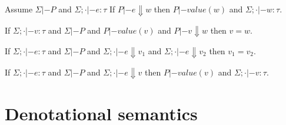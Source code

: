 \documentclass[preprint,nocopyrightspace,draft]{sigplanconf}
\begin{document}
\begin{lemma}
Assume $\Sigma |- P$ and $\Sigma;\cdot |- e : \tau$
If $P |- e \Downarrow w$ then $P |- value(w)$ and $\Sigma;\cdot |- w : \tau$.
\end{lemma}



\newcommand{\lcf}[1]{\textsf{cf}(#1)}
\newcommand{\lcfZ}{\textsf{cf}}
\newcommand{\lncf}[1]{\neg\textsf{cf}(#1)}
\newcommand{\unr}{\mathop{unr}}
\newcommand{\bad}{\mathop{bad}}
\newcommand{\sel}[2]{\mathop{sel\_#1\!\_#2}}
\newcommand{\ctrans}[3]{{\cal C}[\![#3]\!]_{#2}^{#1}}
\newcommand{\etrans}[3]{{\cal E}[\![#3]\!]_{#2}^{#1}}
\newcommand{\utrans}[3]{{\cal U}[\![#3]\!]_{#2}^{#1}}
\newcommand{\dtrans}[2]{{\cal D}[\![#2]\!]^{#1}}
\newcommand{\Dtrans}[2]{{\cal D}[\![#2]\!]^{#1}}
\newcommand{\roll}{\mathsf{roll}}
\newcommand{\unroll}{\mathsf{unroll}}
\newcommand{\bind}{\mathsf{bind}}
\newcommand{\ret}{\mathsf{ret}}
\newcommand{\dlambda}{\mathsf{\lambda}}
\newcommand{\curry}{\mathsf{curry}}
\newcommand{\eval}{\mathsf{eval}}
\newcommand{\uncurry}{\mathsf{incurry}}
\newcommand{\dapp}{\mathsf{app}}
\newcommand{\inj}[1]{\mathsf{inj}_{#1}}

\begin{lemma}
If $\Sigma;\cdot |- v : \tau$ and 
$\Sigma |- P$ and $P |- value(v)$ and $P |- v \Downarrow w$ then $ v = w $.
\end{lemma}

\begin{lemma}
If $\Sigma;\cdot |- e : \tau$ and 
$\Sigma |- P$ and $\Sigma;\cdot |- e \Downarrow v_1$ and $\Sigma;\cdot |- e \Downarrow v_2$ then
$v_1 = v_2$.
\end{lemma}

\begin{lemma}
If $\Sigma;\cdot |- e : \tau$ and 
$\Sigma |- P$ and $\Sigma;\cdot |- e \Downarrow v$ then $P |- value(v)$ and $\Sigma;\cdot |- v : \tau$.
\end{lemma}


\section{Denotational semantics}
\newcommand{\unitcpo}{{\sf{\bf 1}}}
\end{document}
